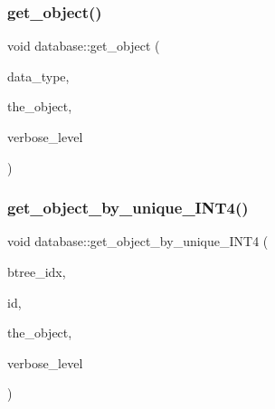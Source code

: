 \mbox{\label{classdatabase_af183761e73fedbd560d9545a36060efc}} 
\subsubsection{\texorpdfstring{get\+\_\+object()}{get\_object()}\hspace{0.1cm}{\footnotesize\ttfamily [2/2]}}
{\footnotesize\ttfamily void database\+::get\+\_\+object (\begin{DoxyParamCaption}\item[{\mbox{\hyperlink{discreta_8h_abf512b6b30146dda9c59049478bf3e99}{D\+A\+T\+A\+T\+Y\+PE}} $\ast$}]{data\+\_\+type,  }\item[{\mbox{\hyperlink{class_vector}{Vector}} \&}]{the\+\_\+object,  }\item[{\mbox{\hyperlink{galois_8h_a09fddde158a3a20bd2dcadb609de11dc}{I\+NT}}}]{verbose\+\_\+level }\end{DoxyParamCaption})}

\mbox{\label{classdatabase_ab93d6176bca88b2eb9356566a25ef6be}} 
\subsubsection{\texorpdfstring{get\+\_\+object\+\_\+by\+\_\+unique\+\_\+\+I\+N\+T4()}{get\_object\_by\_unique\_INT4()}}
{\footnotesize\ttfamily void database\+::get\+\_\+object\+\_\+by\+\_\+unique\+\_\+\+I\+N\+T4 (\begin{DoxyParamCaption}\item[{\mbox{\hyperlink{galois_8h_a09fddde158a3a20bd2dcadb609de11dc}{I\+NT}}}]{btree\+\_\+idx,  }\item[{\mbox{\hyperlink{galois_8h_a09fddde158a3a20bd2dcadb609de11dc}{I\+NT}}}]{id,  }\item[{\mbox{\hyperlink{class_vector}{Vector}} \&}]{the\+\_\+object,  }\item[{\mbox{\hyperlink{galois_8h_a09fddde158a3a20bd2dcadb609de11dc}{I\+NT}}}]{verbose\+\_\+level }\end{DoxyParamCaption})}

